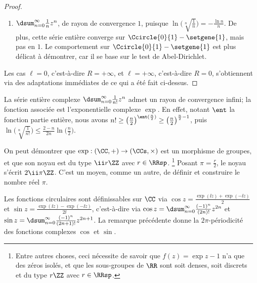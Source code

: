 \begin{proof}
\begin{itemize}
\begin{enumerate}[label=(\alph*)]
	        \item $\dsum_{n=0}^{\infty}  \frac{1}{n} z^n$, 
	        de rayon de convergence $1$,
	        puisque 
	        $ \ln \big( \sqrt[n]{\frac{1}{n}} \big)
	        = -\frac{\ln n}{n}$.
	        De plus,
	        cette série entière converge sur $\Ccircle{0}{1} - \setgene{1}$, mais pas en $1$. 
	        Le comportement sur $\Ccircle{0}{1} - \setgene{1}$ est plus délicat à démontrer, car il se base sur le test de Abel-Dirichlet.
	    \end{enumerate}
    \end{itemize}


    Les cas
    $\ell = 0$, c'est-à-dire $R = +\infty$,
    et
    $\ell = +\infty$, c'est-à-dire $R = 0$,
    s'obtiennent via des adaptations immédiates de ce qui a été fait ci-dessus.
\end{proof}


\begin{example}
	La série entière complexe $\dsum_{n=0}^{\infty} \frac{1}{n!} z^n$ admet un rayon de convergence infini; la fonction associée est l'exponentielle complexe $\exp$.
	En effet,
	notant $\ent$ la fonction partie entière, nous avons
	$n! \geq \big( \frac{n}{2} \big)^{\ent (\frac{n}{2})} \geq \big( \frac{n}{2} \big)^{\frac{n}{2} - 1}$,
	puis
	$ \ln \big( \sqrt[n]{\frac{1}{n!}} \big)
	\leq
	  \frac{2 - n}{2 n} \ln \big( \frac{n}{2} \big)$.
\end{example}


\begin{remark}
	On peut démontrer que
	$\exp : (\CC , {+}) \to (\CCs, {\times})$ est un morphisme de groupes, et que son noyau est du type $\ii r \ZZ$ avec $r \in \RRsp$.%
	\footnote{
	    Entre autres choses, ceci nécessite de savoir que
	    $f(z) = \exp z - 1$ n'a que des zéros isolés,
	    et
	    que les sous-groupes de $\RR$ sont soit denses, soit discrets et du type $r \ZZ$ avec $r \in \RRsp$. 
	}
	Posant $\pi = \frac{r}{2}$, le noyau s'écrit $2 \ii \pi \ZZ$.
	C'est un moyen, comme un autre, de définir et construire le nombre réel $\pi$.
\end{remark}


\begin{example} \label{cos-sin-analytic}
    Les fonctions circulaires sont définissables sur $\CC$ via
    $\cos z = \frac{\exp(\ii z) + \exp(- \ii z)}{2}$
    et
    $\sin z = \frac{\exp(\ii z) - \exp(- \ii z)}{2 \ii}$,
    c'est-à-dire via
    $\cos z = \dsum_{n=0}^{\infty} \frac{(-1)^n}{(2n)!} z^{2n}$
    et
    $\sin z = \dsum_{n=0}^{\infty} \frac{(-1)^n}{(2n+ 1)!} z^{2n+1}$.
    La remarque précédente donne la $2 \pi$-périodicité des fonctions complexes $\cos$ et $\sin$.
\end{example}


